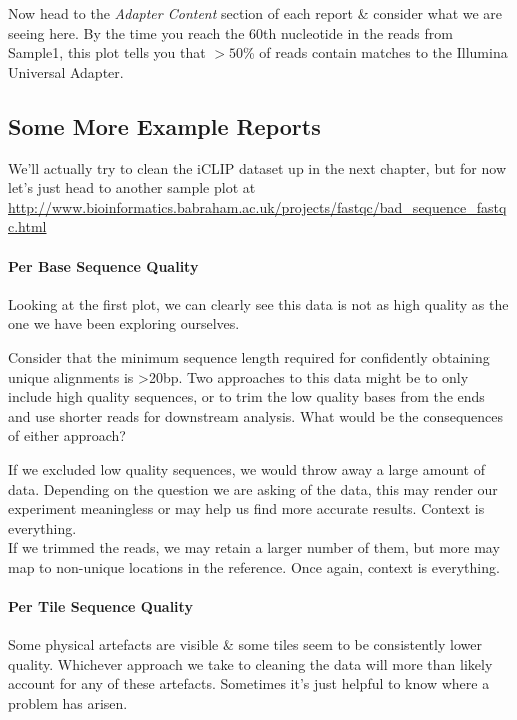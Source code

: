 Now head to the \textit{Adapter Content} section of each report \& consider what we are seeing here.
By the time you reach the 60th nucleotide in the reads from Sample1, this plot tells you that $>50$\% of reads contain matches to the Illumina Universal Adapter.


\subsection{Some More Example Reports}
We'll actually try to clean the iCLIP dataset up in the next chapter, but for now let's just head to another sample plot at \url{http://www.bioinformatics.babraham.ac.uk/projects/fastqc/bad\_sequence\_fastqc.html}


\paragraph{Per Base Sequence Quality}
Looking at the first plot, we can clearly see this data is not as high quality as the one we have been exploring ourselves.

\begin{questions}
Consider that the minimum sequence length required for confidently obtaining unique alignments is >20bp.
Two approaches to this data might be to only include high quality sequences, or to trim the low quality bases from the ends and use shorter reads for downstream analysis.
What would be the consequences of either approach? \\
\begin{answer}
If we excluded low quality sequences, we would throw away a large amount of data.
Depending on the question we are asking of the data, this may render our experiment meaningless or may help us find more accurate results.
Context is everything. \\
If we trimmed the reads, we may retain a larger number of them, but more may map to non-unique locations in the reference.
Once again, context is everything.\\
\end{answer}
\end{questions}

\paragraph{Per Tile Sequence Quality}
Some physical artefacts are visible \& some tiles seem to be consistently lower quality.
Whichever approach we take to cleaning the data will more than likely account for any of these artefacts.
Sometimes it's just helpful to know where a problem has arisen.

